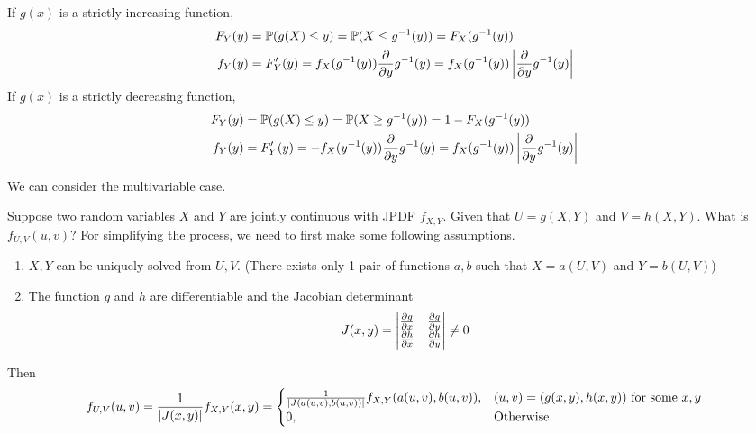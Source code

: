 \documentclass{huhtakm-template-book}
\newcommand{\prob}{\mathbb{P}}
\begin{document}
\begin{proofing}
	If $g(x)$ is a strictly increasing function,
	\begin{align*}
		F_{Y}(y)&=\prob(g(X)\leq y)=\prob(X\leq g^{-1}(y))=F_{X}(g^{-1}(y))\\
		f_{Y}(y)&=F_{Y}'(y)=f_{X}(g^{-1}(y))\pdv*{g^{-1}(y)}{y}=f_{X}(g^{-1}(y))\abs{\pdv*{g^{-1}(y)}{y}}
	\end{align*}
	If $g(x)$ is a strictly decreasing function,
	\begin{align*}
		F_{Y}(y)&=\prob(g(X)\leq y)=\prob(X\geq g^{-1}(y))=1-F_{X}(g^{-1}(y))\\
		f_{Y}(y)&=F_{Y}'(y)=-f_{X}(y^{-1}(y))\pdv*{g^{-1}(y)}{y}=f_{X}(g^{-1}(y))\abs{\pdv*{g^{-1}(y)}{y}}
	\end{align*}
\end{proofing}
We can consider the multivariable case.
\begin{eg}
	Suppose two random variables $X$ and $Y$ are jointly continuous with JPDF $f_{X,Y}$. Given that $U=g(X,Y)$ and $V=h(X,Y)$. What is $f_{U,V}(u,v)$? For simplifying the process, we need to first make some following assumptions.
	\begin{enumerate}
		\item $X,Y$ can be uniquely solved from $U,V$. (There exists only 1 pair of functions $a,b$ such that $X=a(U,V)$ and $Y=b(U,V)$)
		\item The function $g$ and $h$ are differentiable and the Jacobian determinant
		\begin{equation*}
			J(x,y)=\begin{vmatrix}
				\pdv{g}{x} & \pdv{g}{y}\\
				\pdv{h}{x} & \pdv{h}{y}
			\end{vmatrix}\neq 0
		\end{equation*}
	\end{enumerate}
	Then
	\begin{equation*}
		f_{U,V}(u,v)=\frac{1}{\left|{J(x,y)}\right|}f_{X,Y}(x,y)=\begin{cases}
			\frac{1}{\left|{J(a(u,v),b(u,v))}\right|}f_{X,Y}(a(u,v),b(u,v)), &(u,v)=(g(x,y),h(x,y))\text{ for some }x,y\\
			0, &\text{Otherwise}
		\end{cases}
	\end{equation*}
\end{eg}
\end{document}
